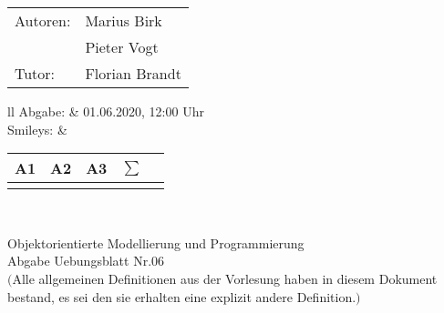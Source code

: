 \documentclass[12pt,a4paper,oneside,ngerman]{article}
\newcommand{\fach}{Objektorientierte Modellierung und Programmierung}
\newcommand{\dokumentenTitel}{Abgabe Uebungsblatt Nr.06}
\newcommand{\Abgabe}{01.06.2020, 12:00 Uhr}
\newcommand{\memberOne}{Marius Birk}
\newcommand{\memberTwo}{Pieter Vogt}
\newcommand{\tutor}{ Florian Brandt }
\begin{document}
	\thispagestyle{plain} %
	
	\begin{multicols}{2} %
		\hspace{-1cm} %
		\begin{tabular}{ll} %
			Autoren: & \memberOne \\ %
			& \memberTwo \\
			Tutor: & \tutor \\  
		\end{tabular}
		
		\columnbreak %
		\hspace{-1cm} %
		\begin{tabular}{ll} %
			Abgabe: & \Abgabe \\ %
			Smileys: &  
			\renewcommand{\arraystretch}{1.2} 
			\begin{tabular}{|p{0.8cm}|p{0.8cm}|p{0.8cm}|p{0.8cm}|p{0.8cm}|}
				\hline A1 & A2 & A3 &$\sum\limits^{ }$ \\ \hline
				& & & \\ \hline    
			\end{tabular} \\
		\end{tabular}
		
	\end{multicols} %
	
	\begin{center}
		\Large{\fach} \\
		\LARGE{\dokumentenTitel} \\
		\small
		$($Alle allgemeinen Definitionen aus der Vorlesung haben in diesem Dokument bestand, es sei den sie erhalten eine explizit andere Definition.$)$
	\end{center}
\end{document}
